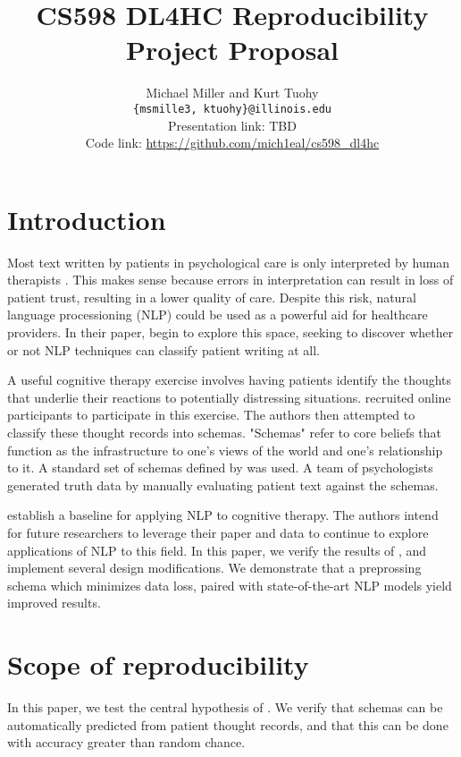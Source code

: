 \documentclass[11pt,a4paper]{article}
\title{CS598 DL4HC Reproducibility Project Proposal}
\author{Michael Miller and Kurt Tuohy \\
  \texttt{\{msmille3, ktuohy\}@illinois.edu}
  \\[2em]
  Presentation link: TBD\url{} \\
  Code link: \url{https://github.com/mich1eal/cs598_dl4hc}}
\begin{document}
\maketitle


\section{Introduction}

Most text written by patients in psychological care is only interpreted by human therapists \citep{burger_2021}. This makes sense because errors in interpretation can result in loss of patient trust, resulting in a lower quality of care. Despite this risk, natural language processioning (NLP) could be used as a powerful aid for healthcare providers. In their paper, \citeauthor{burger_2021} begin to explore this space, seeking to discover whether or not NLP techniques can classify patient writing at all.

A useful cognitive therapy exercise involves having patients identify the thoughts that underlie their reactions to potentially distressing situations. \citeauthor{burger_2021} recruited online participants to participate in this exercise. The authors then attempted to classify these thought records into schemas. "Schemas" refer to core beliefs that function as the infrastructure to one's views of the world and one's relationship to it. A standard set of schemas defined by \citeauthor{millings_2015} was used. A team of psychologists generated truth data by manually evaluating patient text against the schemas. 

\citeauthor{burger_2021} establish a baseline for applying NLP to cognitive therapy. The authors intend for future researchers to leverage their paper and data to continue to explore applications of NLP to this field. In this paper, we verify the results of \citeauthor{burger_2021}, and implement several design modifications. We demonstrate that a preprossing schema which minimizes data loss, paired with state-of-the-art NLP models yield improved results. 

\section{Scope of reproducibility}

In this paper, we test the central hypothesis of \citeauthor{burger_2021}. We verify that schemas can be automatically predicted from patient thought records, and that this can be done with accuracy greater than random chance.
\end{document}
